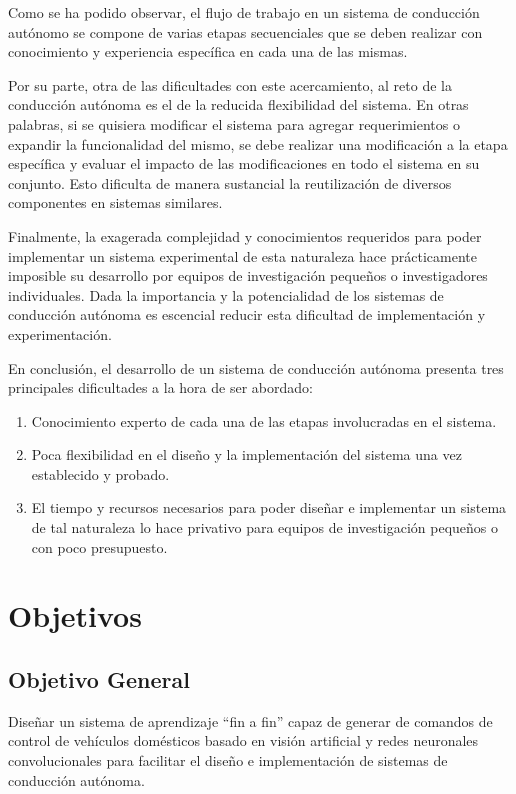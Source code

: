 Como se ha podido observar, el flujo de trabajo en un sistema de conducción autónomo se compone de varias etapas 
secuenciales que se deben realizar con conocimiento y experiencia específica en cada una de las mismas. 

Por su parte, otra de las dificultades con este acercamiento, al reto de la conducción autónoma es el de la reducida
flexibilidad del sistema. En otras palabras, si se quisiera modificar el sistema para agregar requerimientos o 
expandir la funcionalidad del mismo, se debe realizar una modificación a la etapa específica y evaluar el impacto de 
las modificaciones en todo el sistema en su conjunto. Esto dificulta de manera sustancial la reutilización de diversos
componentes en sistemas similares.

Finalmente, la exagerada complejidad y conocimientos requeridos para poder implementar un sistema experimental 
de esta naturaleza hace prácticamente imposible su desarrollo por equipos de investigación pequeños o investigadores 
individuales. Dada la importancia y la potencialidad de los sistemas de conducción autónoma es escencial reducir 
esta dificultad de implementación y experimentación.

En conclusión, el desarrollo de un sistema de conducción autónoma presenta tres principales dificultades a la hora de 
ser abordado: 
\begin{enumerate}
    \item Conocimiento experto de cada una de las etapas involucradas en el sistema.
    \item Poca flexibilidad en el diseño y la implementación del sistema una vez establecido y probado.
    \item El tiempo y recursos necesarios para poder diseñar e implementar un sistema de tal naturaleza lo hace privativo para equipos de investigación pequeños o con poco presupuesto.
\end{enumerate}
\section{Objetivos}
\subsection{Objetivo General}

Diseñar un sistema de aprendizaje “fin a fin” capaz de generar de comandos de 
control de vehículos domésticos basado en visión artificial y redes neuronales 
convolucionales para facilitar el diseño e implementación de sistemas de conducción autónoma.

